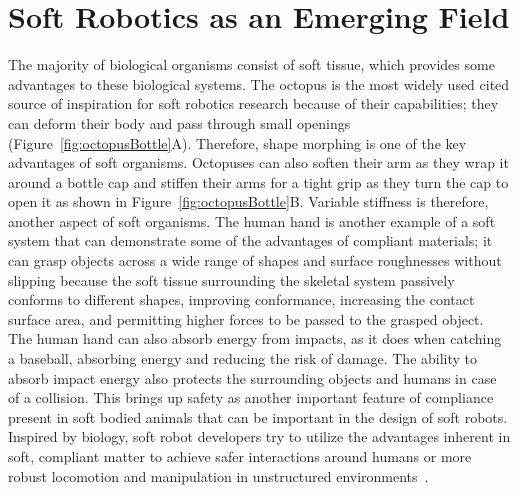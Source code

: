 \section{Soft Robotics as an Emerging Field}
\label{sec:emerging}
The majority of biological organisms consist of soft tissue, which provides some advantages to these biological systems. The octopus is the most widely used cited source of inspiration for soft robotics research because of their capabilities; they can deform their body and pass through small openings (Figure~\ref{fig:octopusBottle}A). Therefore, shape morphing is one of the key advantages of soft organisms. Octopuses can also soften their arm as they wrap it around a bottle cap and stiffen their arms for a tight grip as they turn the cap to open it as shown in Figure~\ref{fig:octopusBottle}B. Variable stiffness is therefore, another aspect of soft organisms. The human hand is another example of a soft system that can demonstrate some of the advantages of compliant materials; it can grasp objects across a wide range of shapes and surface roughnesses without slipping because the soft tissue surrounding the skeletal system passively conforms to different shapes, improving conformance, increasing the contact surface area, and permitting higher forces to be passed to the grasped object. The human hand can also absorb energy from impacts, as it does when catching a baseball, absorbing energy and reducing the risk of damage. The ability to absorb impact energy also protects the surrounding objects and humans in case of a collision. This brings up safety as another important feature of compliance present in soft bodied animals  that can be important in the design of soft robots. Inspired by biology, soft robot developers try to utilize the advantages inherent in soft, compliant matter to achieve safer interactions around humans or more robust locomotion and manipulation in unstructured environments~\cite{martinez2013,laschi2012,Tolley2014d,AdamBilodeau2015}.	

